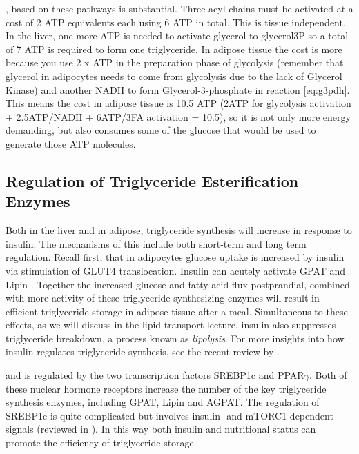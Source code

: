 \documentclass{tufte-handout}
\begin{document}
, based on these pathways is substantial.  Three acyl chains must be activated at a cost of 2 ATP equivalents each using 6 ATP in total. This is tissue independent. In the liver, one more ATP is needed to activate glycerol to glycerol3P so a total of 7 ATP is required to form one triglyceride.  In adipose tissue the cost is more because you use 2 x ATP in the preparation phase of glycolysis (remember that glycerol in adipocytes needs to come from glycolysis due to the lack of Glycerol Kinase) and another NADH to form Glycerol-3-phosphate in reaction \ref{eq:g3pdh}.  This means the cost in adipose tissue is 10.5 ATP (2ATP for glycolysis activation + 2.5ATP/NADH + 6ATP/3FA activation = 10.5), so it is not only more energy demanding, but also consumes some of the glucose that would be used to generate those ATP molecules.

\subsection{Regulation of Triglyceride Esterification Enzymes}  

Both in the liver and in adipose, triglyceride synthesis will increase in response to insulin.  The mechanisms of this include both short-term and long term regulation.  Recall first, that in adipocytes glucose uptake is increased by insulin via stimulation of GLUT4 translocation.  Insulin can acutely activate GPAT and Lipin .  Together the increased glucose and fatty acid flux postprandial, combined with more activity of these triglyceride synthesizing enzymes will result in efficient triglyceride storage in adipose tissue after a meal. Simultaneous to these effects, as we will discuss in the lipid transport lecture, insulin also suppresses triglyceride breakdown, a process known as \emph{lipolysis}.  For more insights into how insulin regulates triglyceride synthesis, see the recent review by \citet{Coleman2011}.

 and is regulated by the two transcription factors SREBP1c and PPAR$\gamma$. Both of these nuclear hormone receptors increase the number of the key triglyceride synthesis enzymes, including GPAT, Lipin and AGPAT. The regulation of SREBP1c is quite complicated but involves insulin- and mTORC1-dependent signals (reviewed in \citet{Bakan2012}). In this way both insulin and nutritional status can promote the efficiency of triglyceride storage.
\end{document}
